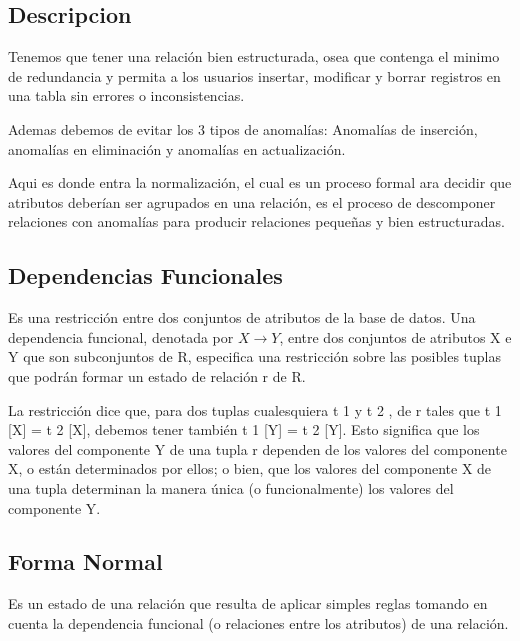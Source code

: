 \documentclass[12pt, fleqn]{report}                             %
\theoremstyle{break}                                            %
\begin{document}
    \subsection{Descripcion}
    Tenemos que tener una relación bien estructurada, osea que contenga el minimo de redundancia y permita a los usuarios insertar, modificar y borrar registros en una tabla sin errores o inconsistencias.

    Ademas debemos de evitar los 3 tipos de anomalías: Anomalías de inserción, anomalías en eliminación y anomalías en actualización.

    Aqui es donde entra la normalización, el cual es un proceso formal ara decidir que atributos deberían ser agrupados en una relación, es el proceso de descomponer relaciones con anomalías para producir relaciones pequeñas y bien estructuradas.
    \subsection{Dependencias Funcionales}
    Es una restricción entre dos conjuntos de atributos de
la base de datos.
Una dependencia funcional, denotada por $X \rightarrow Y$, entre dos conjuntos de
atributos X e Y que son subconjuntos de R, especifica una restricción sobre las
posibles tuplas que podrán formar un estado de relación r de R.


La restricción dice que, para dos tuplas cualesquiera t 1 y t 2 , de r tales que t 1 [X] =
t 2 [X], debemos tener también t 1 [Y] = t 2 [Y]. Esto significa que los valores del
componente Y de una tupla r dependen de los valores del componente X, o están
determinados por ellos; o bien, que los valores del componente X de una tupla
determinan la manera única (o funcionalmente) los valores del componente Y.
    \subsection{Forma Normal}
    Es un estado de una relación que resulta de aplicar simples
reglas tomando en cuenta la dependencia funcional (o relaciones entre los
atributos) de una relación.
\end{document}
